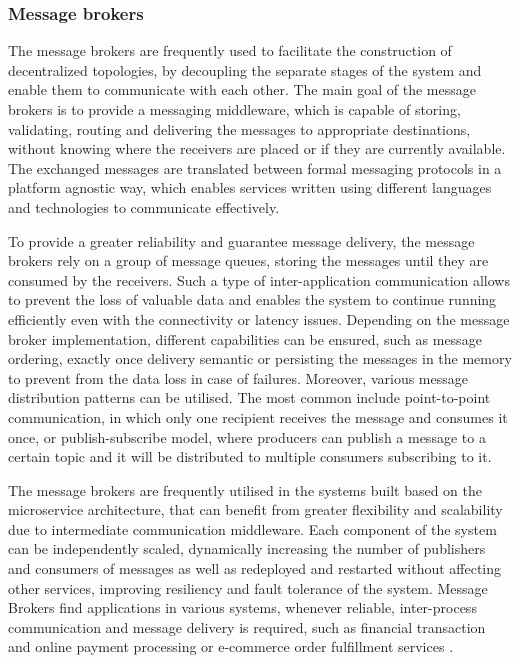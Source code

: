 \subsubsection{Message brokers}

The message brokers are frequently used to facilitate the construction of decentralized topologies, by decoupling the separate stages of the system and enable them to communicate with each other. The main goal of the message brokers is to provide a messaging middleware, which is capable of storing, validating, routing and delivering the messages to appropriate destinations, without knowing where the receivers are placed or if they are currently available. The exchanged messages are translated between formal messaging protocols in a platform agnostic way, which enables services written using different languages and technologies to communicate effectively.

To provide a greater reliability and guarantee message delivery, the message brokers rely on a group of message queues, storing the messages until they are consumed by the receivers. Such a type of inter-application communication allows to prevent the loss of valuable data and enables the system to continue running efficiently even with the connectivity or latency issues. Depending on the message broker implementation, different capabilities can be ensured, such as message ordering, exactly once delivery semantic or persisting the messages in the memory to prevent from the data loss in case of failures.
Moreover, various message distribution patterns can be utilised. The most common include point-to-point communication, in which only one recipient receives the message and consumes it once, or publish-subscribe model, where producers can publish a message to a certain topic and it will be distributed to multiple consumers subscribing to it.

The message brokers are frequently utilised in the systems built based on the microservice architecture, that can benefit from greater flexibility and scalability due to intermediate communication middleware. Each component of the system can be independently scaled, dynamically increasing the number of publishers and consumers of messages as well as redeployed and restarted without affecting other services, improving resiliency and fault tolerance of the system. Message Brokers find applications in various systems, whenever reliable, inter-process communication and message delivery is required, such as financial transaction and online payment processing or e-commerce order fulfillment services \cite{MessageBrokers}.

